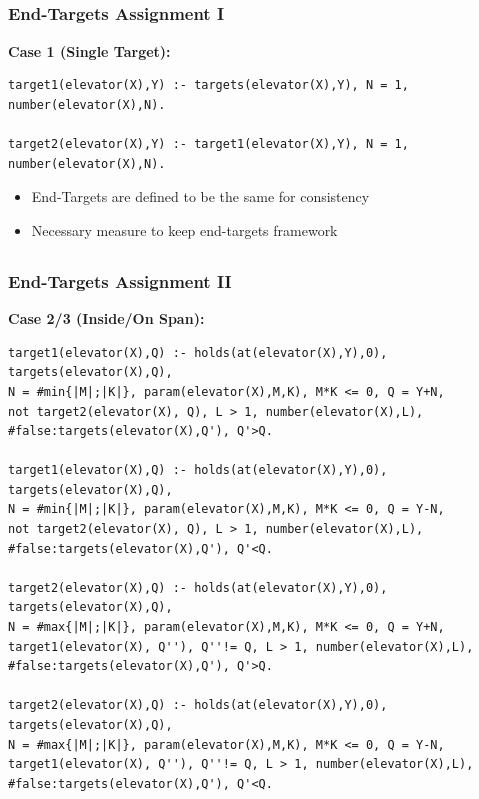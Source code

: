 \documentclass{beamer}
\begin{document}
\subsection{}
\begin{frame}[fragile]
\frametitle{End-Targets Assignment I}
\begin{adjustwidth}{-1em}{-1em}
\textbf{Case 1 (Single Target):}
\vspace{5pt}
\begin{lstlisting}
target1(elevator(X),Y) :- targets(elevator(X),Y), N = 1, 
number(elevator(X),N).

target2(elevator(X),Y) :- target1(elevator(X),Y), N = 1, 
number(elevator(X),N).
\end{lstlisting}
\begin{itemize}
    \setlength\itemsep{1em}
    \item End-Targets are defined to be the same for consistency
    \item Necessary measure to keep end-targets framework
\end{itemize}
\end{adjustwidth}
\end{frame}

\subsection{}
\begin{frame}[fragile]
\frametitle{End-Targets Assignment II}
\begin{adjustwidth}{-1em}{-1em}
\textbf{Case 2/3 (Inside/On Span):}
\vspace{5pt}
\begin{lstlisting}[basicstyle=\scriptsize\ttfamily]
target1(elevator(X),Q) :- holds(at(elevator(X),Y),0), targets(elevator(X),Q), 
N = #min{|M|;|K|}, param(elevator(X),M,K), M*K <= 0, Q = Y+N, 
not target2(elevator(X), Q), L > 1, number(elevator(X),L), 
#false:targets(elevator(X),Q'), Q'>Q.

target1(elevator(X),Q) :- holds(at(elevator(X),Y),0), targets(elevator(X),Q), 
N = #min{|M|;|K|}, param(elevator(X),M,K), M*K <= 0, Q = Y-N, 
not target2(elevator(X), Q), L > 1, number(elevator(X),L), 
#false:targets(elevator(X),Q'), Q'<Q.

target2(elevator(X),Q) :- holds(at(elevator(X),Y),0), targets(elevator(X),Q), 
N = #max{|M|;|K|}, param(elevator(X),M,K), M*K <= 0, Q = Y+N, 
target1(elevator(X), Q''), Q''!= Q, L > 1, number(elevator(X),L), 
#false:targets(elevator(X),Q'), Q'>Q.

target2(elevator(X),Q) :- holds(at(elevator(X),Y),0), targets(elevator(X),Q), 
N = #max{|M|;|K|}, param(elevator(X),M,K), M*K <= 0, Q = Y-N, 
target1(elevator(X), Q''), Q''!= Q, L > 1, number(elevator(X),L), 
#false:targets(elevator(X),Q'), Q'<Q.
\end{lstlisting}
\end{adjustwidth}
\end{frame}
\end{document}
